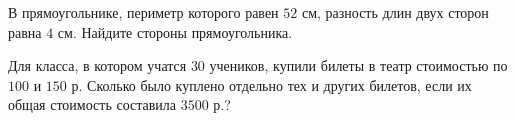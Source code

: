\begin{class}[number=7]
\begin{listofex}
		\item В прямоугольнике, периметр которого равен \(52\) см, разность длин двух сторон равна \(4\) см. Найдите стороны прямоугольника.
		\item Для класса, в котором учатся \(30\) учеников, купили билеты в театр стоимостью по \(100\) и \(150\) р. Сколько было куплено отдельно тех и других билетов, если их общая стоимость составила \(3500\) р.?
	\end{listofex}
\end{class}

